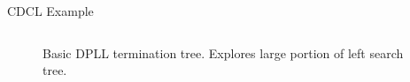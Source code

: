 \documentclass{beamer}
\begin{document}
\begin{frame}{CDCL Example}
\begin{columns}
        \begin{column}{0.70\textwidth}
            \begin{figure}
                
                \caption{Basic DPLL termination tree. Explores large portion of left search tree.}
            \end{figure}
        \end{column}
    \end{columns}
\end{frame}

\end{document}
